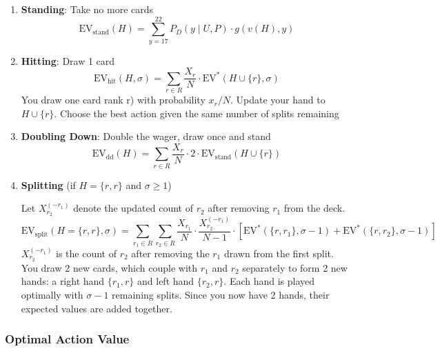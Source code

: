 \documentclass[12pt,a4paper]{cibb}
\begin{document}
\begin{enumerate}
    \item \textbf{Standing}: Take no more cards
    \begin{equation}
        \mathrm{EV}_{\text{stand}}(H) = \sum_{y=17}^{22} P_D(y \mid U, P) \cdot g(v(H), y)
        \label{eq:EV_STAND}
    \end{equation}

    \item \textbf{Hitting}: Draw 1 card
    \begin{equation}
          \mathrm{EV}_{\text{hit}}(H, σ  ) = \sum_{r \in R} \frac{X_r}{N} \cdot \mathrm{EV}^*(H \cup \{r\}, σ  )
        \label{eq:EV_HIT}
    \end{equation}
You draw one card rank r) with probability \(x_r/N\).
Update your hand to \(H \cup \{r\}\). Choose the best action given the same number of splits remaining

    \item \textbf{Doubling Down}: Double the wager, draw once and stand
    \begin{equation}
        \mathrm{EV}_{\text{dd}}(H) = \sum_{r \in R} \frac{X_r}{N} \cdot 2 \cdot \mathrm{EV}_{\text{stand}}(H \cup \{r\})
        \label{eq:EV_DOUBLE}
    \end{equation}

\item \textbf{Splitting} (if $H = \{r, r\}$ and $\sigma \geq 1$)

  Let $X_{r_2}^{(-r_1)}$ denote the updated count of $r_2$ after removing $r_1$ from the deck.
  \begin{equation}
    \mathrm{EV}_{\text{split}}(H = \{r, r\}, \sigma ) = \sum_{r_1 \in R} \sum_{r_2 \in R} \frac{X_{r_1}}{N} \cdot \frac{X_{r_2}^{(-r_1)}}{N - 1} \cdot \left[ \mathrm{EV}^*(\{r, r_1\}, \sigma - 1) + \mathrm{EV}^*(\{r, r_2\}, \sigma - 1) \right]
    \label{eq:EV_SPLIT}
  \end{equation}
  $X_{r_2}^{(-r_1)}$ is the count of $r_2$ after removing the $r_1$ drawn from the first split.
  You draw 2 new cards, which couple with $r_1$ and $r_2$ separately to form 2 new hands: a right hand $\{r_1, r\}$ and left hand $\{r_2, r\}$.
  Each hand is played optimally with $\sigma - 1$ remaining splits. Since you now have 2 hands, their expected values are added together.
\end{enumerate}
\subsubsection*{Optimal Action Value}
\end{document}
